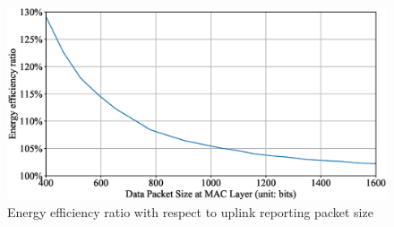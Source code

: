 \begin{figure}[!t]
	\centering
	\includegraphics[width=\linewidth]{Chapter6/Figures/energy_efficiency_ratio.eps}
	\caption{Energy efficiency ratio with respect to uplink reporting packet size}
	\label{fig:energy_efficiency_ratio}
\end{figure}

